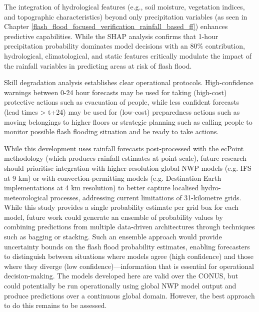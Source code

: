 The integration of hydrological features (e.g., soil moisture, vegetation indices, and topographic characteristics) beyond only precipitation variables (as seen in Chapter \ref{flash_flood_focused_verification_rainfall_based_ff}) enhances predictive capabilities. While the SHAP analysis confirms that 1-hour precipitation probability dominates model decisions with an 80\% contribution, hydrological, climatological, and static features critically modulate the impact of the rainfall variables in predicting areas at risk of flash flood.

Skill degradation analysis establishes clear operational protocols. High-confidence warnings between 0-24 hour forecasts may be used for taking (high-cost) protective actions such as evacuation of people, while less confident forecasts (lead times > t+24) may be used for (low-cost) preparedness actions such as moving belongings to higher floors or strategic planning such as calling people to monitor possible flash flooding situation and be ready to take actions. 

While this development uses rainfall forecasts post-processed with the ecPoint methodology (which produces rainfall estimates at point-scale), future research should prioritise integration with higher-resolution global NWP models (e.g. IFS at 9 km) or with convection-permitting models (e.g. Destination Earth implementations at 4 km resolution) to better capture localised hydro-meteorological processes, addressing current limitations of 31-kilometre grids. While this study provides a single probability estimate per grid box for each model, future work could generate an ensemble of probability values by combining predictions from multiple data-driven architectures through techniques such as bagging or stacking. Such an ensemble approach would provide uncertainty bounds on the flash flood probability estimates, enabling forecasters to distinguish between situations where models agree (high confidence) and those where they diverge (low confidence)—information that is essential for operational decision-making. The models developed here are valid over the CONUS, but could potentially be run operationally using global NWP model output and produce predictions over a continuous global domain. However, the best approach to do this remains to be assessed.